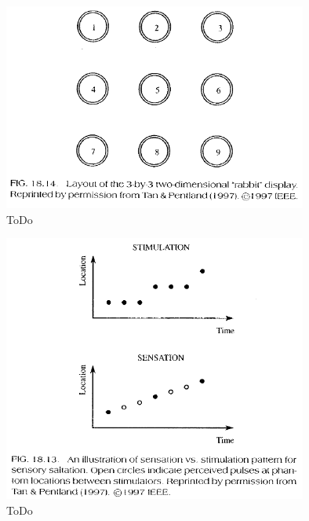 \documentclass{llncs}					%
\begin{document}
\begin{figure}[htbp]
	\begin{center}
		\includegraphics[width = 10cm]{Grafiken/14-3x3-Grid.png}
		\caption{ToDo}
		\label{14-3x3-Grid}
	\end{center}
\end{figure}


\begin{figure}[htbp]
	\begin{center}
		\includegraphics[width = 10cm]{Grafiken/14-Sensory-Saltation.png}
		\caption{ToDo}
		\label{14-Sensory-Saltation}
	\end{center}
\end{figure}
\end{document}
